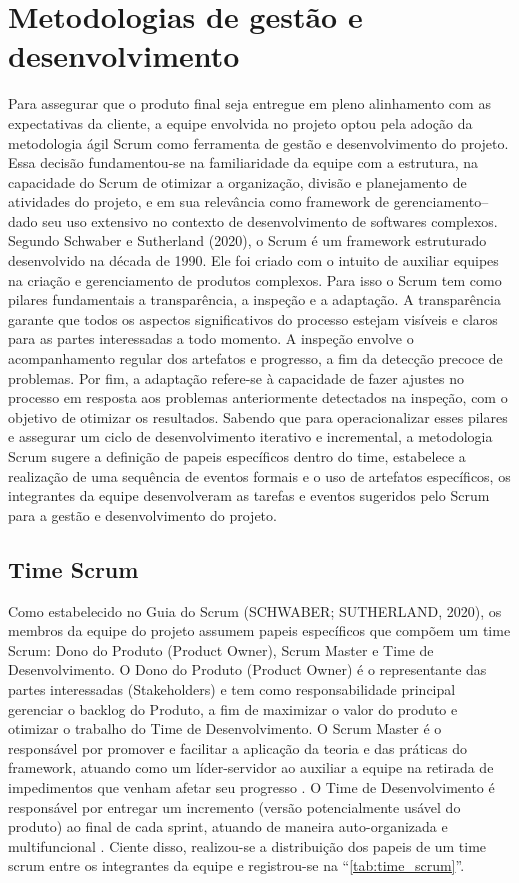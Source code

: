 \documentclass[
	12pt,				%
	openany,			%
	twoside,			%
	a4paper,			%
	english,			%
	french,				%
	spanish,			%
	brazil				%
	]{abntex2}
\begin{document}
\section{Metodologias de gestão e desenvolvimento}
Para assegurar que o produto final seja entregue em pleno alinhamento com as expectativas da cliente, a equipe envolvida no projeto optou pela adoção da metodologia ágil Scrum como ferramenta de gestão e desenvolvimento do projeto. Essa decisão fundamentou-se na familiaridade da equipe com a estrutura, na capacidade do Scrum de otimizar a organização, divisão e planejamento de atividades do projeto, e em sua relevância como framework de gerenciamento– dado seu uso extensivo no contexto de desenvolvimento de softwares complexos.
Segundo Schwaber e Sutherland (2020), o Scrum é um framework estruturado desenvolvido na década de 1990. Ele foi criado com o intuito de auxiliar equipes na criação e gerenciamento de produtos complexos. Para isso o Scrum tem como pilares fundamentais a transparência, a inspeção e a adaptação. A transparência garante que todos os aspectos significativos do processo estejam visíveis e claros para as partes interessadas a todo momento. A inspeção envolve o acompanhamento regular dos artefatos e progresso, a fim da detecção precoce de problemas. Por fim, a adaptação refere-se à capacidade de fazer ajustes no processo  em resposta aos problemas anteriormente detectados na inspeção, com o objetivo de otimizar os resultados.
Sabendo que para operacionalizar esses pilares e assegurar um ciclo de desenvolvimento iterativo e incremental, a metodologia Scrum sugere a definição de papeis específicos dentro do time, estabelece a realização de uma sequência de eventos formais e o uso de artefatos específicos, os integrantes da equipe desenvolveram as tarefas e eventos sugeridos pelo Scrum para a gestão e desenvolvimento do projeto.

\subsection{Time Scrum}
Como estabelecido no Guia do Scrum (SCHWABER; SUTHERLAND, 2020), os membros da equipe do projeto assumem papeis específicos que compõem um time Scrum: Dono do Produto (Product Owner), Scrum Master e Time de Desenvolvimento. 
O Dono do Produto (Product Owner) é o representante das partes interessadas (Stakeholders) e tem como responsabilidade principal gerenciar o backlog do Produto, a fim de maximizar o valor do produto e otimizar o trabalho do Time de Desenvolvimento. 
O Scrum Master é o responsável por promover e facilitar a aplicação da teoria e das práticas do framework, atuando como um líder-servidor ao auxiliar a equipe na retirada de impedimentos que venham afetar seu progresso . 
O Time de Desenvolvimento é responsável por entregar um incremento (versão potencialmente usável do produto) ao final de cada sprint, atuando de maneira auto-organizada e multifuncional . 
Ciente disso, realizou-se a distribuição dos papeis de um time scrum entre os integrantes da equipe e registrou-se na “\autoref{tab:time_scrum}”.
\end{document}
